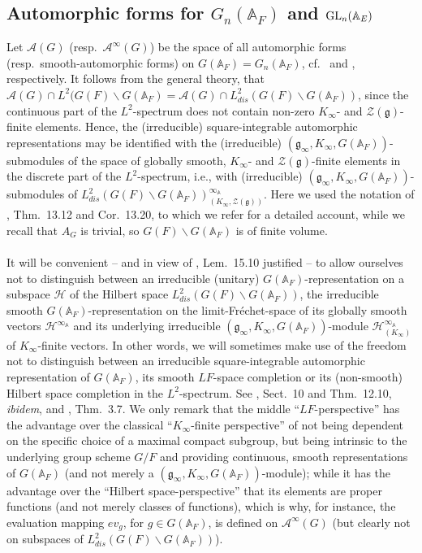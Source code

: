 \documentclass[a4paper,10pt]{amsart}
\theoremstyle{definition}
\numberwithin{equation}{section}
\def\A{\mathbb A}
\def\g{\mathfrak g}
\def\GL{{\rm GL}}
\begin{document}
\subsection{Automorphic forms for $G_n(\A_F)$ and $\GL_n(\A_E)$}
Let $\mathcal A(G)$ (resp.\ $\mathcal A^\infty(G)$) be the space of all automorphic forms (resp.\ smooth-automorphic forms) on $G(\A_F)=G_n(\A_F)$, cf.\ \cite[Sect.\ 4.5]{bojac} and \cite[Sect.\ 11.5 and Def.\ 11.10]{grob_book}, respectively. It follows from the general theory, that $\mathcal A(G)\cap L^2(G(F)\backslash G(\A_F)=\mathcal A(G)\cap L^2_{dis}(G(F)\backslash G(\A_F))$, since the continuous part of the $L^2$-spectrum does not contain non-zero $K_\infty$- and $\mathcal Z(\g)$-finite elements. Hence, the (irreducible) square-integrable automorphic representations may be identified with the (irreducible) $(\g_\infty,K_\infty, G(\A_F))$-submodules of the space of globally smooth, $K_\infty$- and $\mathcal Z(\g)$-finite elements in the discrete part of the $L^2$-spectrum, i.e., with (irreducible) $(\g_\infty,K_\infty, G(\A_F))$-submodules of $L^2_{dis}(G(F)\backslash G(\A_F))^{\infty_\A}_{(K_\infty,\mathcal Z(\g))}$. Here we used the notation of \cite{grob_book}, Thm.\ 13.12 and Cor.\ 13.20, to which we refer for a detailed account, while we recall that $A_G$ is trivial, so $G(F)\backslash G(\A_F)$ is of finite volume.\\\\ 
It will be convenient -- and in view of \cite{grob_book}, Lem.\ 15.10 justified -- to allow ourselves not to distinguish between an irreducible (unitary) $G(\A_F)$-representation on a subspace $\mathcal H$ of the Hilbert space $L^2_{dis}(G(F)\backslash G(\A_F))$, the irreducible smooth $G(\A_F)$-representation on the limit-Fr\'echet-space of its globally smooth vectors $\mathcal H^{\infty_\A}$ and its underlying irreducible $(\g_\infty,K_\infty, G(\A_F))$-module $\mathcal H^{\infty_\A}_{(K_\infty)}$ of $K_\infty$-finite vectors. In other words, we will sometimes make use of the freedom not to distinguish between an irreducible square-integrable automorphic representation of $G(\A_F)$, its smooth $LF$-space completion or its (non-smooth) Hilbert space completion in the $L^2$-spectrum. See \cite{grob_book}, Sect.\ 10 and Thm.\ 12.10, {\it ibidem}, and \cite{grob_zun}, Thm.\ 3.7. We only remark that the middle ``$LF$-perspective'' has the advantage over the classical ``$K_\infty$-finite perspective'' of not being dependent on the specific choice of a maximal compact subgroup, but being intrinsic to the underlying group scheme $G/F$ and providing continuous, smooth representations of $G(\A_F)$ (and not merely a $(\g_\infty,K_\infty, G(\A_F))$-module); while it has the advantage over the ``Hilbert space-perspective'' that its elements are proper functions (and not merely classes of functions), which is why, for instance, the evaluation mapping $ev_g$, for $g\in G(\A_F)$, is defined on $\mathcal A^\infty(G)$ (but clearly not on subspaces of $L^2_{dis}(G(F)\backslash G(\A_F))$).
\end{document}
